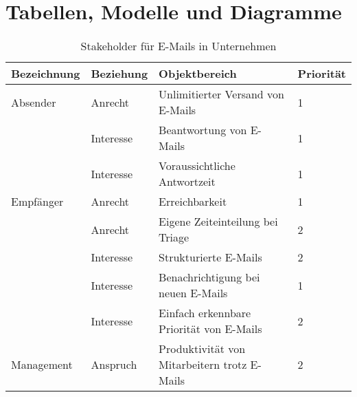 
\chapter{Tabellen, Modelle und Diagramme}
\label{Tabellen_Modelle_Diagramme}

\begin{table}[ht]
	\centering
	\caption[Stakeholderanalyse]{Stakeholder für E-Mails in Unternehmen}
		\vspace{1.0em}	
    \begin{tabular}{|l|l|l|l|}
    \hline
    \textbf{Bezeichnung}                   & \textbf{Beziehung} & \textbf{Objektbereich}                                             & \textbf{Priorität} \\ \hline
    Absender              & Anrecht            & Unlimitierter Versand von E-Mails                                  & 1                  \\ \cline{2-4} 
                                           & Interesse          & Beantwortung von E-Mails                                           & 1                  \\ \cline{2-4} 
                                           & Interesse          & Voraussichtliche Antwortzeit                                       & 1                  \\ \hline
    Empfänger             & Anrecht            & Erreichbarkeit                                                     & 1                  \\ \cline{2-4} 
                                           & Anrecht            & Eigene Zeiteinteilung bei Triage                                   & 2                  \\ \cline{2-4} 
                                           & Interesse          & Strukturierte E-Mails                                              & 2                  \\ \cline{2-4} 
                                           & Interesse          & Benachrichtigung bei neuen E-Mails                                   & 1                  \\ \cline{2-4} 
                                           & Interesse          & Einfach erkennbare Priorität von E-Mails                           & 2                  \\ \hline
    Management            & Anspruch           & Produktivität von Mitarbeitern trotz E-Mails                       & 2                  \\ \cline{2-4} 

\end{tabular}
\end{table}
